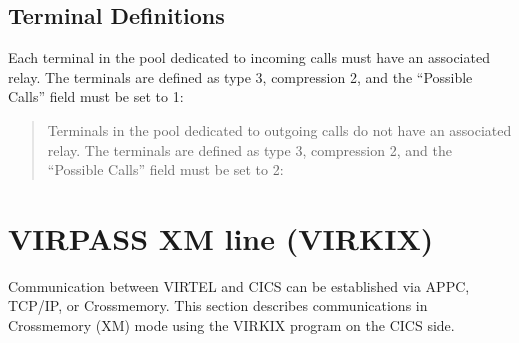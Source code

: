 \documentclass[letterpaper,10pt,english]{sphinxmanual}
\begin{document}
\ignorespaces 

\subsection{Terminal Definitions}
\label{\detokenize{connectivity_guide:index-47}}\label{\detokenize{connectivity_guide:id19}}
\sphinxAtStartPar
Each terminal in the pool dedicated to incoming calls must have an associated relay. The terminals are defined as type 3, compression 2, and the “Possible Calls” field must be set to 1:

\sphinxAtStartPar
{}
\begin{quote}

\sphinxAtStartPar
Terminals in the pool dedicated to outgoing calls do not have an associated relay. The terminals are defined as type 3, compression 2, and the “Possible Calls” field must be set to 2:
\end{quote}

\sphinxAtStartPar
{}

\newpage

\ignorespaces 

\section{VIRPASS XM line (VIRKIX)}
\label{\detokenize{connectivity_guide:virpass-xm-line-virkix}}\label{\detokenize{connectivity_guide:index-48}}
\sphinxAtStartPar
Communication between VIRTEL and CICS can be established via APPC, TCP/IP, or Cross\sphinxhyphen{}memory. This section describes communications in Cross\sphinxhyphen{}memory (XM) mode using the VIRKIX program on the CICS side.

\sphinxAtStartPar
{}

\ignorespaces 
\end{document}
